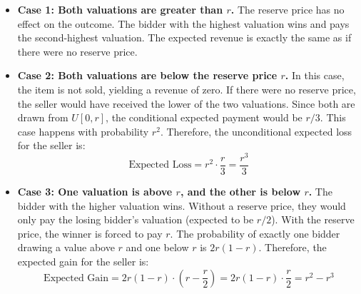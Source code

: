 \begin{itemize}
    \item \textbf{Case 1: Both valuations are greater than $r$.} The reserve price has no effect on the outcome. The bidder with the highest valuation wins and pays the second-highest valuation. The expected revenue is exactly the same as if there were no reserve price.

    \item \textbf{Case 2: Both valuations are below the reserve price $r$.} In this case, the item is not sold, yielding a revenue of zero. If there were no reserve price, the seller would have received the lower of the two valuations. Since both are drawn from $U[0,r]$, the conditional expected payment would be $r/3$. This case happens with probability $r^2$. Therefore, the unconditional expected loss for the seller is:
    \[
    \text{Expected Loss} = r^2 \cdot \frac{r}{3} = \frac{r^3}{3}
    \]

    \item \textbf{Case 3: One valuation is above $r$, and the other is below $r$.} The bidder with the higher valuation wins. Without a reserve price, they would only pay the losing bidder's valuation (expected to be $r/2$). With the reserve price, the winner is forced to pay $r$. The probability of exactly one bidder drawing a value above $r$ and one below $r$ is $2r(1-r)$. Therefore, the expected gain for the seller is:
    \[
    \text{Expected Gain} = 2r(1-r) \cdot \left(r - \frac{r}{2}\right) = 2r(1-r) \cdot \frac{r}{2} = r^2 - r^3
    \]
\end{itemize}


